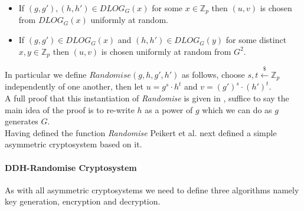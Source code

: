 \documentclass[ %
                    author={Nicholas Tutte},
                supervisor={Prof. Nigel Smart},
                    degree={MEng},
                     title={Secure Two Party Computation},
                  subtitle={A practical comparison of recent protocols},
                      type={Research - GG1K},
                      year={2015} ]{dissertation}
\begin{document}
					\begin{itemize}
						\item If $(g, g'), (h, h') \in DLOG_G(x)$ for some $x \in \mathbb{Z}_p$ then $(u, v)$ is chosen from $DLOG_G(x)$ uniformly at random.

						\item If $(g, g')\in DLOG_G(x)$ and $(h, h') \in DLOG_G(y)$ for some distinct $x, y \in \mathbb{Z}_p$ then $(u, v)$ is chosen uniformly at random from $G^2$.
					\end{itemize}
					In particular we define $Randomise(g, h, g', h')$ as follows, choose $s, t \xleftarrow{\$} \mathbb{Z}_p$ independently of one another, then let $u = g^s \cdot h^t$ and $v = (g')^s \cdot (h')^t$.\\
					A full proof that this instantiation of \emph{Randomise} is given in \cite{PVW_OT_2008}, suffice to say the main idea of the proof is to re-write $h$ as a power of $g$ which we can do as $g$ generates $G$.\\
					Having defined the function \emph{Randomise} Peikert et al. next defined a simple asymmetric cryptosystem based on it.

					\paragraph{DDH-Randomise Cryptosystem} As with all asymmetric cryptosystems we need to define three algorithms namely key generation, encryption and decryption.
\end{document}
